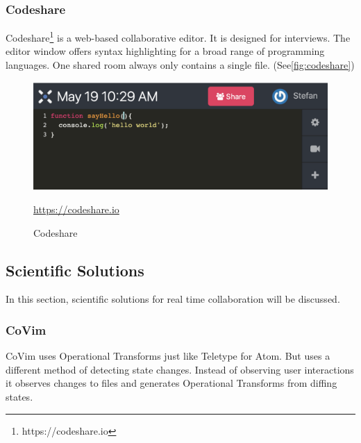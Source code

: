 \subsubsection{Codeshare}
Codeshare\footnote{https://codeshare.io} is a web-based collaborative editor. It is designed for interviews. The editor window offers syntax highlighting for a broad range of programming languages. One shared room always only contains a single file. (See\autoref{fig:codeshare})
\begin{figure}[h]
    \centering
    \includegraphics[width=1\linewidth]{figures/screenshots/codeshare.png}
	\caption{Codeshare}
	\href{https://codeshare.io}{https://codeshare.io}
    \label{fig:codeshare}
\end{figure}


\subsection{Scientific Solutions}

In this section, scientific solutions for real time collaboration will be discussed.

\subsubsection{CoVim}
CoVim \cite{ChoNgSun:2017:CoVim:Incorporatingreal-timecollaborationcapabilitiesintocomprehensivetexteditors} uses Operational Transforms just like Teletype for Atom. But uses a different method of detecting state changes. Instead of observing user interactions it observes changes to files and generates Operational Transforms from diffing states.


